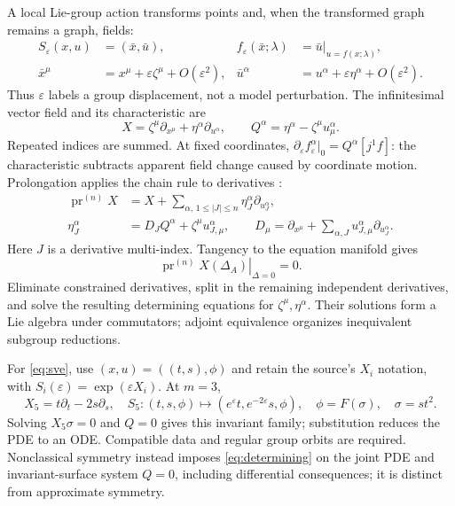 \documentclass[11pt]{article}
\newcommand{\pr}{\operatorname{pr}}
\begin{document}
A local Lie-group action transforms points and, when the transformed graph
remains a graph, fields:
\begin{align}
S_\varepsilon(x,u)&=(\bar x,\bar u),&
f_\varepsilon(\bar x;\lambda)&=\bar u\big|_{u=f(x;\lambda)},\\
\bar x^\mu&=x^\mu+\varepsilon\zeta^\mu+O(\varepsilon^2),&
\bar u^\alpha&=u^\alpha+\varepsilon\eta^\alpha+O(\varepsilon^2).
\end{align}
Thus $\varepsilon$ labels a group displacement, not a model perturbation.
The infinitesimal vector field and its characteristic are
\begin{equation}
X=\zeta^\mu\partial_{x^\mu}+\eta^\alpha\partial_{u^\alpha},
\qquad Q^\alpha=\eta^\alpha-\zeta^\mu u^\alpha_\mu.
\end{equation}
Repeated indices are summed. At fixed coordinates,
$\partial_\varepsilon f_\varepsilon^\alpha|_0=Q^\alpha[j^1f]$:
the characteristic subtracts apparent field change caused by coordinate
motion. Prolongation applies the chain rule to derivatives \cite{olver}:
\begin{align}
\pr^{(n)}X&=X+\sum_{\alpha,\,1\le|J|\le n}\eta_J^\alpha
\partial_{u_J^\alpha},\\
\eta_J^\alpha&=D_JQ^\alpha+\zeta^\mu u^\alpha_{J,\mu},
\qquad D_\mu=\partial_{x^\mu}+\sum_{\alpha,J}
u^\alpha_{J,\mu}\partial_{u_J^\alpha}.
\end{align}
Here $J$ is a derivative multi-index. Tangency to the equation manifold gives
\begin{equation}
\left.\pr^{(n)}X(\Delta_A)\right|_{\Delta=0}=0.
\label{eq:determining}
\end{equation}
Eliminate constrained derivatives, split in the remaining independent
derivatives, and solve the resulting determining equations for
$\zeta^\mu,\eta^\alpha$. Their solutions form a Lie algebra under commutators;
adjoint equivalence organizes inequivalent subgroup reductions.

For \eqref{eq:sve}, use $(x,u)=((t,s),\phi)$ and retain the source's
$X_i$ notation, with $S_i(\varepsilon)=\exp(\varepsilon X_i)$.
At $m=3$,
\begin{equation}
X_5=t\partial_t-2s\partial_s,
\quad S_5:(t,s,\phi)\mapsto(e^\varepsilon t,e^{-2\varepsilon}s,\phi),
\quad \phi=F(\sigma),\quad \sigma=st^2.
\end{equation}
Solving $X_5\sigma=0$ and $Q=0$ gives this invariant family; substitution
reduces the PDE to an ODE. Compatible data and regular group orbits are
required. Nonclassical symmetry instead imposes \eqref{eq:determining} on
the joint PDE and invariant-surface system $Q=0$, including differential
consequences; it is distinct from approximate symmetry.
\end{document}
